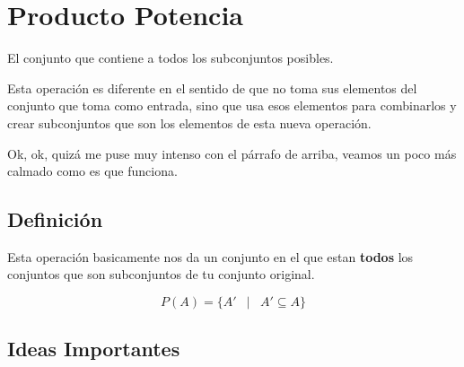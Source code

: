 \documentclass[12pt, fleqn]{report}                             %
\DeclareMathOperator \Space {\quad}                             %
\DeclareMathOperator \MiniSpace {\;}                            %
\newcommand \Such {\MiniSpace|\MiniSpace}                       %
\begin{document}
        \clearpage
        \section{Producto Potencia}

            El conjunto que contiene a todos los subconjuntos posibles. 

            Esta operación es diferente en el sentido de que no toma sus elementos del conjunto
            que toma como entrada, sino que usa esos elementos para combinarlos y crear subconjuntos
            que son los elementos de esta nueva operación.

            Ok, ok, quizá me puse muy intenso con el párrafo de arriba, veamos un poco más calmado
            como es que funciona.

            \subsection*{Definición}

                Esta operación basicamente nos da un conjunto en el que estan \textbf{todos} los
                conjuntos que son subconjuntos de tu conjunto original.

                \begin{equation}
                    P(A) = \{ A' \Such A' \subseteq A \}
                \end{equation}


            \clearpage
            \subsection{Ideas Importantes}
\end{document}
